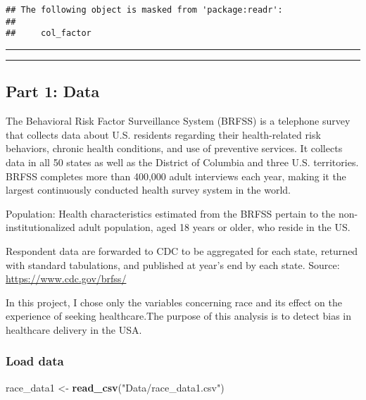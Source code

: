 \documentclass[]{article}
\newenvironment{Shaded}{\begin{snugshade}}{\end{snugshade}}
\newcommand{\KeywordTok}[1]{\textcolor[rgb]{0.13,0.29,0.53}{\textbf{#1}}}
\newcommand{\NormalTok}[1]{#1}
\newcommand{\StringTok}[1]{\textcolor[rgb]{0.31,0.60,0.02}{#1}}
\begin{document}
\begin{verbatim}
## The following object is masked from 'package:readr':
## 
##     col_factor
\end{verbatim}

\begin{center}\rule{0.5\linewidth}{\linethickness}\end{center}

\begin{center}\rule{0.5\linewidth}{\linethickness}\end{center}

\hypertarget{part-1-data}{%
\subsection{Part 1: Data}\label{part-1-data}}

The Behavioral Risk Factor Surveillance System (BRFSS) is a telephone
survey that collects data about U.S. residents regarding their
health-related risk behaviors, chronic health conditions, and use of
preventive services. It collects data in all 50 states as well as the
District of Columbia and three U.S. territories. BRFSS completes more
than 400,000 adult interviews each year, making it the largest
continuously conducted health survey system in the world.

Population: Health characteristics estimated from the BRFSS pertain to
the non-institutionalized adult population, aged 18 years or older, who
reside in the US.

Respondent data are forwarded to CDC to be aggregated for each state,
returned with standard tabulations, and published at year's end by each
state. Source: \url{https://www.cdc.gov/brfss/}

In this project, I chose only the variables concerning race and its
effect on the experience of seeking healthcare.The purpose of this
analysis is to detect bias in healthcare delivery in the USA.

\hypertarget{load-data}{%
\subsubsection{Load data}\label{load-data}}

\begin{Shaded}
\begin{Highlighting}[]
\NormalTok{race_data1 <-}\StringTok{ }\KeywordTok{read_csv}\NormalTok{(}\StringTok{"Data/race_data1.csv"}\NormalTok{)}
\end{Highlighting}
\end{Shaded}
\end{document}
